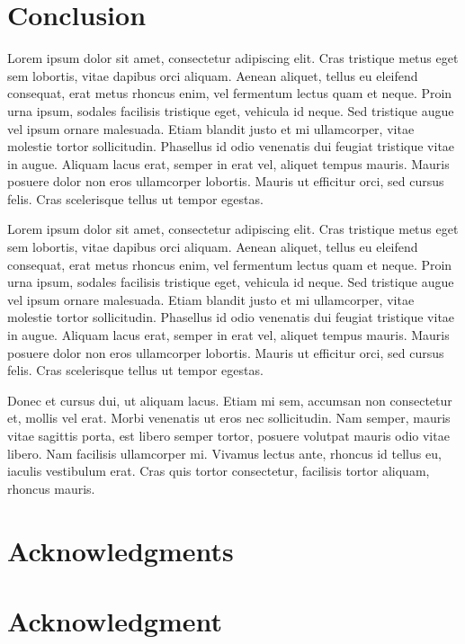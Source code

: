 \documentclass[conference,compsoc]{IEEEtran}
\begin{document}
\section{Conclusion}
Lorem ipsum dolor sit amet, consectetur adipiscing elit. Cras tristique metus eget sem lobortis, vitae dapibus orci aliquam. Aenean aliquet, tellus eu eleifend consequat, erat metus rhoncus enim, vel fermentum lectus quam et neque. Proin urna ipsum, sodales facilisis tristique eget, vehicula id neque. Sed tristique augue vel ipsum ornare malesuada. Etiam blandit justo et mi ullamcorper, vitae molestie tortor sollicitudin. Phasellus id odio venenatis dui feugiat tristique vitae in augue. Aliquam lacus erat, semper in erat vel, aliquet tempus mauris. Mauris posuere dolor non eros ullamcorper lobortis. Mauris ut efficitur orci, sed cursus felis. Cras scelerisque tellus ut tempor egestas. 

Lorem ipsum dolor sit amet, consectetur adipiscing elit. Cras tristique metus eget sem lobortis, vitae dapibus orci aliquam. Aenean aliquet, tellus eu eleifend consequat, erat metus rhoncus enim, vel fermentum lectus quam et neque. Proin urna ipsum, sodales facilisis tristique eget, vehicula id neque. Sed tristique augue vel ipsum ornare malesuada. Etiam blandit justo et mi ullamcorper, vitae molestie tortor sollicitudin. Phasellus id odio venenatis dui feugiat tristique vitae in augue. Aliquam lacus erat, semper in erat vel, aliquet tempus mauris. Mauris posuere dolor non eros ullamcorper lobortis. Mauris ut efficitur orci, sed cursus felis. Cras scelerisque tellus ut tempor egestas. 

Donec et cursus dui, ut aliquam lacus. Etiam mi sem, accumsan non consectetur et, mollis vel erat. Morbi venenatis ut eros nec sollicitudin. Nam semper, mauris vitae sagittis porta, est libero semper tortor, posuere volutpat mauris odio vitae libero. Nam facilisis ullamcorper mi. Vivamus lectus ante, rhoncus id tellus eu, iaculis vestibulum erat. Cras quis tortor consectetur, facilisis tortor aliquam, rhoncus mauris.


\ifCLASSOPTIONcompsoc
  \section*{Acknowledgments}
\else
  \section*{Acknowledgment}
\fi
\end{document}
